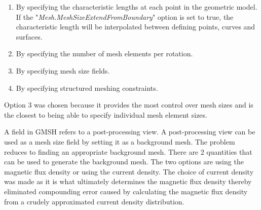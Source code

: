 \begin{enumerate}
    \item By specifying the characteristic lengths at each point in the geometric model. If the "\textit{Mesh.MeshSizeExtendFromBoundary}" option is set to true, the characteristic length will be interpolated between defining points, curves and surfaces.
    \item By specifying the number of mesh elements per rotation.
    \item By specifying mesh size fields.
    \item By specifying structured meshing constraints.
\end{enumerate}
Option 3 was chosen because it provides the most control over mesh sizes and is the closest to being able to specify individual mesh element sizes. \par
A field in GMSH refers to a post-processing view. A post-processing view can be used as a mesh size field by setting it as a background mesh. The problem reduces to finding an appropriate background mesh. There are 2 quantities that can be used to generate the background mesh. The two options are using the magnetic flux density or using the current density. The choice of current density was made as it is what ultimately determines the magnetic flux density thereby eliminated compounding error caused by calculating the magnetic flux density from a crudely approximated current density distribution.
